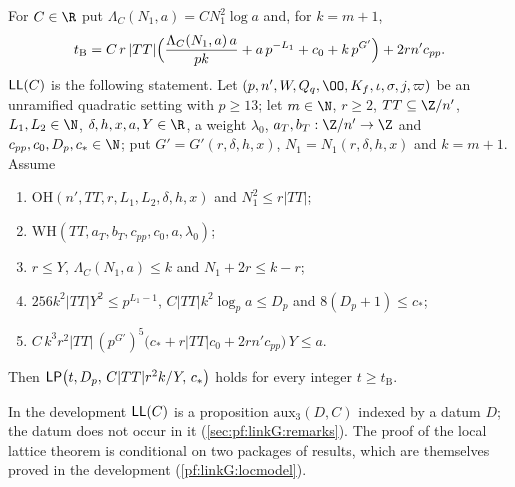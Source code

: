 \begin{definition}\label{pf:linkG:LocLat}
For $C\in\R$ put $\Lambda_C(N_1,a)=CN_1^2\log a$ and, for $k=m+1$,
\[
t_{\mathrm{B}}=C\,r\,|TT|\Bigl(\frac{\Lambda_C(N_1,a)\,a}{pk}+a\,p^{-L_1}+c_0+k\,p^{G'}\Bigr)+2rn'c_{pp}.
\]
$\mathsf{LL}(C)$ is the following statement. Let $(p,n',W,Q_q,\OO,K_f,\iota,\sigma,j,\varpi)$ be an unramified quadratic
setting with $p\ge13$; let $m\in\N$, $r\ge2$, $TT\subseteq\Z/n'$, $L_1,L_2\in\N$, $\delta,h,x,a,Y\in\R$, a weight
$\lambda_0$, $a_T,b_T:\Z/n'\to\Z$ and $c_{pp},c_0,D_p,c_*\in\N$; put $G'=G'(r,\delta,h,x)$, $N_1=N_1(r,\delta,h,x)$
and $k=m+1$. Assume
\begin{enumerate}[label=(H\arabic*)]
\item\label{pf:linkG:H1} $\mathrm{OH}(n',TT,r,L_1,L_2,\delta,h,x)$ and $N_1^2\le r|TT|$;
\item\label{pf:linkG:H2} $\mathrm{WH}(TT,a_T,b_T,c_{pp},c_0,a,\lambda_0)$;
\item\label{pf:linkG:H3} $r\le Y$, $\Lambda_C(N_1,a)\le k$ and $N_1+2r\le k-r$;
\item\label{pf:linkG:H4} $256k^2|TT|Y^2\le p^{L_1-1}$, $C|TT|k^2\log_pa\le D_p$ and $8(D_p+1)\le c_*$;
\item\label{pf:linkG:H5} $C\,k^3r^2|TT|\,(p^{G'})^5\bigl(c_*+r|TT|c_0+2rn'c_{pp}\bigr)\,Y\le a$.
\end{enumerate}
Then $\mathsf{LP}\bigl(t,D_p,\,C|TT|r^2k/Y,\,c_*\bigr)$ holds for every integer $t\ge t_{\mathrm B}$.
\end{definition}

In the development $\mathsf{LL}(C)$ is a proposition $\mathrm{aux}_3(D,C)$ indexed by a datum $D$; the datum does not
occur in it (\cref{sec:pf:linkG:remarks}). The proof of the local lattice theorem is conditional on two packages
of results, which are themselves proved in the development (\cref{pf:linkG:locmodel}).

